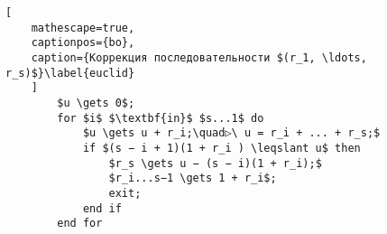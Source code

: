 

    \setcounter{chapter}{3}


    \setcounter{subsection}{32}


    \chaptertop
    \setcounter{page}{406}

    \setcounter{lstlisting}{7}
    \begin{center}
    \begin{minipage}{0.80\textwidth}
    \begin{lstlisting}[
    mathescape=true,
    captionpos={bo},
    caption={Коррекция последовательности $(r_1, \ldots, r_s)$}\label{euclid}
    ]
    	$u \gets 0$;
    	for $i$ $\textbf{in}$ $s...1$ do
    		$u \gets u + r_i;\quad▷\ u = r_i + ... + r_s;$
    		if $(s − i + 1)(1 + r_i ) \leqslant u$ then
    			$r_s \gets u − (s − i)(1 + r_i);$
    			$r_i...s−1 \gets 1 + r_i$;
    			exit;
    		end if
    	end for
    \end{lstlisting}
    \end{minipage}
    \end{center}



